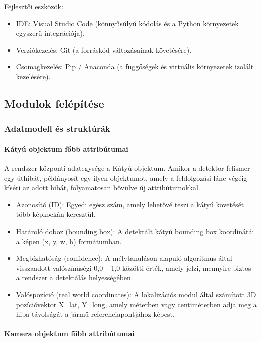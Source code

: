 Fejlesztői eszközök:

\begin{itemize}
	\item
	IDE: Visual Studio Code (könnyűsúlyú kódolás és a Python környezetek egyszerű integrációja).
	\item
	Verziókezelés: Git (a forráskód változásainak követésére).
	\item
	Csomagkezelés: Pip / Anaconda (a függőségek és virtuális környezetek
	izolált kezelésére).
\end{itemize}


\subsection{Modulok felépítése}

\subsubsection{Adatmodell és struktúrák}

\paragraph{Kátyú objektum főbb attribútumai}

A rendszer központi adategysége a Kátyú objektum. Amikor a detektor
felismer egy úthibát, példányosít egy ilyen objektumot, amely a
feldolgozási lánc végéig kíséri az adott hibát, folyamatosan bővülve új
attribútumokkal.

\begin{itemize}
\item
  Azonosító (ID): Egyedi egész szám, amely lehetővé teszi a kátyú
  követését több képkockán keresztül.
\item
  Határoló doboz (bounding box): A detektált kátyú bounding box
  koordinátái a képen (x, y, w, h) formátumban.
\item
  Megbízhatóság (confidence): A mélytanuláson alapuló algoritmus által
  visszaadott valószínűségi 0,0 -- 1,0 közötti érték, amely jelzi,
  mennyire biztos a rendszer a detektálás helyességében.
\item
  Valóspozíció (real world coordinates): A lokalizációs modul által
  számított 3D pozícióvektor X\_lat, Y\_long, amely méterben vagy
  centiméterben adja meg a hiba távolságát a jármű referenciapontjához
  képest.
\end{itemize}

\paragraph{Kamera objektum főbb attribútumai}

